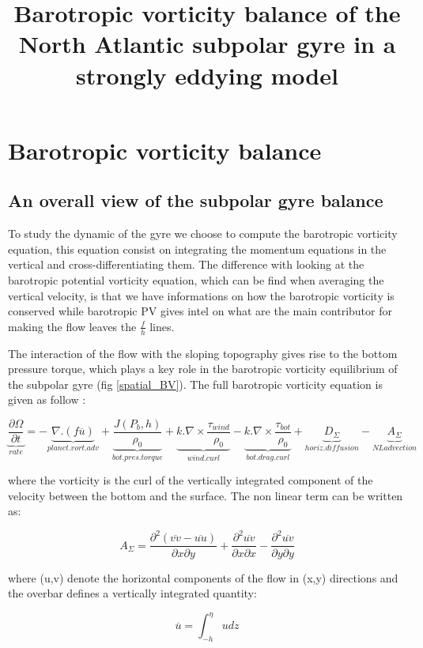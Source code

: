 \documentclass{ametsoc}
\title{Barotropic vorticity balance of the North Atlantic subpolar gyre in a strongly eddying model}
\affiliation{Univ. Brest, CNRS, IRD, Ifremer, Laboratoire d’Océanographie Physique et Spatiale (LOPS), IUEM, Brest, France}
\begin{document}
\section{Barotropic vorticity balance}

\subsection{An overall view of the subpolar gyre balance}

To study the dynamic of the gyre we choose to compute the barotropic vorticity equation, this equation consist on integrating the momentum equations in the vertical and cross-differentiating them. The difference with looking at the barotropic potential vorticity equation, which can be find when averaging the vertical velocity, is that we have informations on how the barotropic vorticity is conserved while barotropic PV gives intel on what are the main contributor for making the flow leaves the $\frac{f}{h}$ lines.

The interaction of the flow with the sloping topography gives rise to the bottom pressure torque, which plays a key role in the barotropic vorticity equilibrium of the subpolar gyre (fig \ref{spatial_BV}). The full barotropic vorticity equation is given as follow \citep{gula2015}:

$$\underbrace{\frac{\partial \Omega}{\partial t}}_{rate} = -\underbrace{\nabla.(f\overline{u})}_{planet.vort.adv}+\underbrace{\frac{J(P_b,h)}{\rho _0}}_{bot.pres.torque} +\underbrace{k.\nabla \times \frac{\tau _{wind}}{\rho_{0}}}_{wind.curl} -\underbrace{k.\nabla \times \frac{\tau _{bot}}{\rho_{0}}}_{bot.drag.curl} +\underbrace{D_{\Sigma}}_{horiz.diffusion}-\underbrace{A_{\Sigma}}_{NL advection}$$

where the vorticity is the curl of the vertically integrated component of the velocity between the bottom and the surface. The non linear term can be written as:


$$A_{\Sigma}= \frac{\partial ^2 (\overline{vv}-\overline{uu})}{\partial x \partial y}+\frac{\partial ^2 \overline{uv}}{\partial x \partial x} -\frac{\partial ^2 \overline{uv}}{\partial y \partial y}$$

where (u,v) denote the horizontal components of the flow in (x,y) directions and the overbar defines a vertically integrated quantity:

$$\overline{u}=\int^{\eta}_{-h} u dz$$
\end{document}
